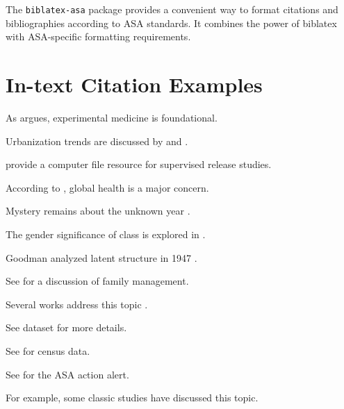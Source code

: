 \documentclass{article}
\begin{document}
The \texttt{biblatex-asa} package provides a convenient way to format citations and bibliographies according to ASA standards. It combines the power of biblatex with ASA-specific formatting requirements.

\nocite{*} %


\section*{In-text Citation Examples}

As \textcite{bernard1957} argues, experimental medicine is foundational.

Urbanization trends are discussed by \textcite{lee2021a} and \textcite{lee2021b}.

\textcite{deschenes2000} provide a computer file resource for supervised release studies.

According to \textcite{WHO2022}, global health is a major concern.

Mystery remains about the unknown year \parencite{doe_nodate}.

The gender significance of class is explored in \textcite{szelenyiForthcoming}.

Goodman analyzed latent structure in 1947 \parencite{goodman1947a, goodman1947b}.

See \parencite[pp.~63--93]{sampson1992} for a discussion of family management.

Several works address this topic \parencite{brown2022,kao2003,smith2020a}.

See dataset \textcite{charles1990} for more details.

See \textcite{usbc1960} for census data.

See \textcite{ASA1997} for the ASA action alert.

For example, some classic studies \parencite[e.g., ][]{abbott1981,phillips2001} have discussed this topic.


\printbibliography[title={REFERENCES}]
\end{document}
